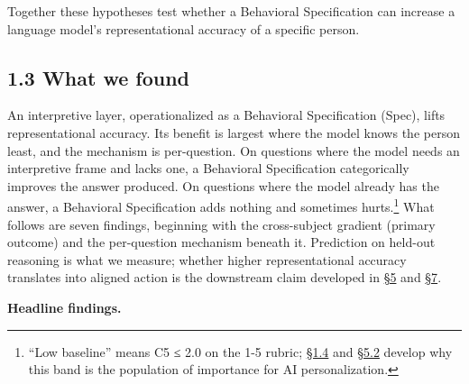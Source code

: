 Together these hypotheses test whether a Behavioral Specification can
increase a language model's representational accuracy of a specific
person.

\hypertarget{what-we-found}{%
\subsection{1.3 What we found}\label{what-we-found}}

An interpretive layer, operationalized as a Behavioral Specification
(Spec), lifts representational accuracy. Its benefit is largest where
the model knows the person least, and the mechanism is per-question. On
questions where the model needs an interpretive frame and lacks one, a
Behavioral Specification categorically improves the answer produced. On
questions where the model already has the answer, a Behavioral
Specification adds nothing and sometimes hurts.\footnote{``Low
  baseline'' means C5 ≤ 2.0 on the 1-5 rubric; \hyperref[what-this-implies]{§1.4} and \hyperref[why-the-gradient-is-the-load-bearing-finding]{§5.2} develop why
  this band is the population of importance for AI personalization.}
What follows are seven findings, beginning with the
cross-subject gradient (primary outcome) and the per-question mechanism
beneath it. Prediction on held-out reasoning is what we measure; whether
higher representational accuracy translates into aligned action is the
downstream claim developed in \hyperref[discussion]{§5} and \hyperref[future-work]{§7}.

\textbf{Headline findings.}

